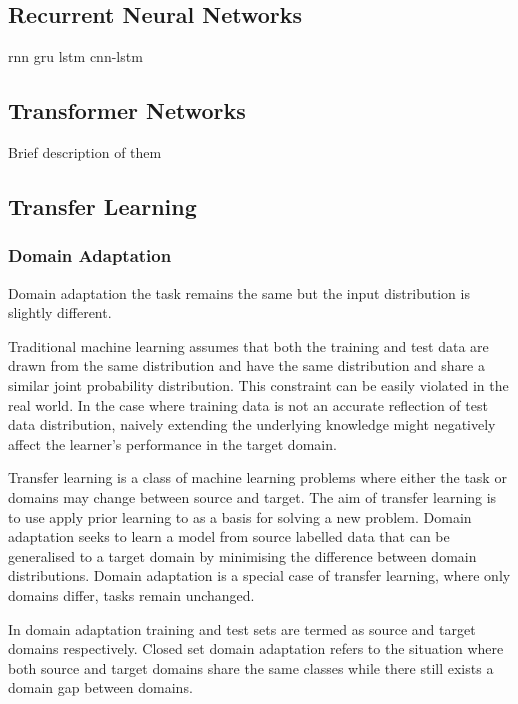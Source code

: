 \subsection{Recurrent Neural Networks}
\acrshort{rnn}
\acrshort{gru}
\acrshort{lstm}
\acrshort{cnn}-\acrshort{lstm}

\subsection{Transformer Networks}
Brief description of them

\subsection{Transfer Learning}


\subsubsection{Domain Adaptation} %
Domain adaptation the task remains the same but the input distribution is slightly different.\cite{Goodfellow2015}

Traditional machine learning assumes that both the training and test data are drawn from the same distribution and have the same distribution and share a similar joint probability distribution. This constraint can be easily violated in the real world. In the case where training data is not an accurate reflection of test data distribution, naively extending the underlying knowledge might negatively affect the learner's performance in the target domain.\cite{Farahani2021}

Transfer learning is a class of machine learning problems where either the task or domains may change between source and target. The aim of transfer learning is to use apply prior learning to as a basis for solving a new problem. Domain adaptation seeks to learn a model from source labelled data that can be generalised to a target domain by minimising the difference between domain distributions. Domain adaptation is a special case of transfer learning, where only domains differ, tasks remain unchanged.\cite{Farahani2021}

In domain adaptation training and test sets are termed as source and target domains respectively. Closed set domain adaptation refers to the situation where both source and target domains share the same classes while there still exists a domain gap between domains.\cite{Farahani2021}



